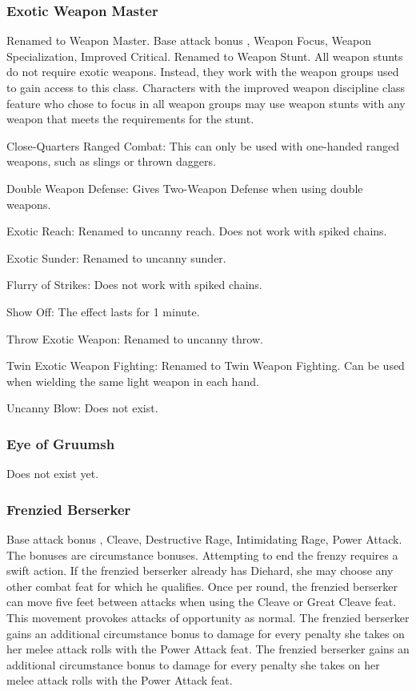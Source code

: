 \subsubsection{Exotic Weapon Master}
Renamed to Weapon Master.
 Base attack bonus , Weapon Focus, Weapon Specialization, Improved Critical.
 Renamed to Weapon Stunt. All weapon stunts do not require exotic weapons. Instead, they work with the weapon groups used to gain access to this class. Characters with the improved weapon discipline class feature who chose to focus in all weapon groups may use weapon stunts with any weapon that meets the requirements for the stunt.
\begin{itemize*}
\item Close-Quarters Ranged Combat: This can only be used with one-handed ranged weapons, such as slings or thrown daggers.
\item Double Weapon Defense: Gives Two-Weapon Defense when using double weapons.
\item Exotic Reach: Renamed to uncanny reach. Does not work with spiked chains.
\item Exotic Sunder: Renamed to uncanny sunder.
\item Flurry of Strikes: Does not work with spiked chains.
\item Show Off: The effect lasts for 1 minute.
\item Throw Exotic Weapon: Renamed to uncanny throw.
\item Twin Exotic Weapon Fighting: Renamed to Twin Weapon Fighting. Can be used when wielding the same light weapon in each hand. 
\item Uncanny Blow: Does not exist.
\end{itemize*}
\subsubsection{Eye of Gruumsh}
Does not exist yet.
\subsubsection{Frenzied Berserker}
 Base attack bonus , Cleave, Destructive Rage, Intimidating Rage, Power Attack.
 The bonuses are circumstance bonuses. Attempting to end the frenzy requires a swift action.
 If the frenzied berserker already has Diehard, she may choose any other combat feat for which he qualifies.
 Once per round, the frenzied berserker can move five feet between attacks when using the Cleave or Great Cleave feat. This movement provokes attacks of opportunity as normal.
 The frenzied berserker gains an additional  circumstance bonus to damage for every  penalty she takes on her melee attack rolls with the Power Attack feat.
 The frenzied berserker gains an additional  circumstance bonus to damage for every  penalty she takes on her melee attack rolls with the Power Attack feat.
